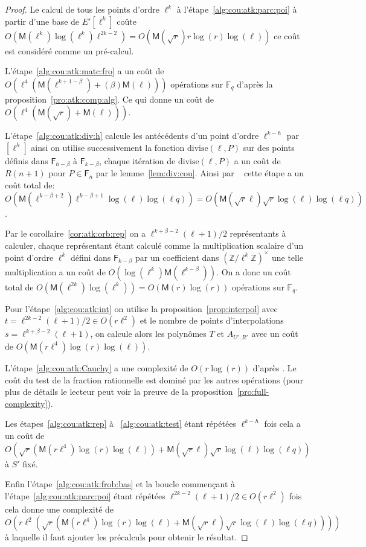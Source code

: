 \documentclass[10pt,a4paper]{book}
\theoremstyle{plain}
\theoremstyle{definition}
\theoremstyle{definition}
\theoremstyle{definition}
\theoremstyle{definition}
\theoremstyle{remark}
\theoremstyle{remark}
\theoremstyle{definition}
\begin{document}
\begin{proof}
Le calcul de tous les points d'ordre $\ell^k$ à 
l'étape~\ref{alg:cou:atk:parc:poi} à partir d'une base de $E'[\ell^k]$ coûte 
$O(\mathsf{M}(\ell^k)\log(\ell^k)\ell^{2k-2})=
O(\mathsf{M}(\sqrt{r})r\log(r)\log(\ell))$ ce coût est considéré comme 
un pré-calcul.

L'étape~\ref{alg:cou:atk:matc:fro} a un coût de 
$O(\ell^4(\mathsf{M}(\ell^{k+1-\beta})+(\beta)\mathsf{M}(\ell)))$ 
opérations sur $\mathbb{F}_q$ d'après la proposition~\ref{pro:atk:comp:alg}.
Ce qui donne un coût de $O(\ell^4(\mathsf{M}(\sqrt{r})+\mathsf{M}(\ell)))$.

L'étape~\ref{alg:cou:atk:div:h} calcule les antécédents d'un point d'ordre
$\ell^{k-h}$ par $[\ell^h]$ ainsi on utilise successivement la fonction 
$\mathrm{divise}(\ell,P)$ sur des points définis dans $\mathsf{F}_{h-\beta}$ à
$\mathsf{F}_{k-\beta}$, chaque itération de $\mathrm{divise}(\ell,P)$ a un coût
de $R(n+1)$ pour $P \in \mathsf{F}_n$ par le lemme~\ref{lem:div:cou}. Ainsi 
par ~\cite[Chapter~14.5]{vzGJG03} cette étape a un coût total de: 
$O(\mathsf{M}(\ell^{k-\beta + 2})\ell^{k-\beta+1}\log(\ell)\log(\ell q))=
O(\mathsf{M}(\sqrt{r}\ell)\sqrt{r}\log(\ell)\log(\ell q))$.

Par le corollaire~\ref{cor:atk:orb:rep} on a $\ell^{k+\beta-2}(\ell+1)/2$ 
représentants à calculer, chaque représentant étant 
calculé comme la multiplication scalaire d'un point d'ordre $\ell^k$ défini 
dans $\mathsf{F}_{k-\beta}$ par un coefficient dans 
$(\mathbb{Z}/\ell^k\mathbb{Z})^{\times}$ une telle multiplication a un coût
de $O(\log(\ell^k)\mathsf{M}(\ell^{k-\beta}))$. On a donc un coût total de 
$O(\mathsf{M}(\ell^{2k})\log(\ell^k))=O(\mathsf{M}(r)\log(r))$ opérations sur 
$\mathbb{F}_q$.

Pour l'étape~\ref{alg:cou:atk:int} on utilise la 
proposition~\ref{prop:interpol} avec $t=\ell^{2k-2}(\ell+1)/2 \in O(r\ell^2)$ 
et le nombre de points d'interpolations $s=\ell^{k+\beta-2}(\ell+1)$, on 
calcule alors les polynômes $T$ et $A_{U',R'}$ avec un coût de 
$O(\mathsf{M}(r\ell^4)\log(r)\log(\ell))$. 

L'étape~\ref{alg:cou:atk:Cauchy} a une complexité de $O(r\log(r))$ d'après
\cite[Théorème 7.5]{algeff17}. Le coût du test de la fraction rationnelle est
dominé par les autres opérations (pour plus de détails le lecteur peut voir 
la preuve de la proposition~\ref{pro:full-complexity}).

Les étapes~\ref{alg:cou:atk:rep} à ~\ref{alg:cou:atk:test} étant répétées 
$\ell^{k-h}$ fois cela a un coût de 
$O(\sqrt{r}(\mathsf{M}(r\ell^4)\log(r)\log(\ell))+\mathsf{M}(\sqrt{r}\ell)\sqrt{r}\log(\ell)\log(\ell q))$ 
à $S'$ fixé.

Enfin l'étape~\ref{alg:cou:atk:frob:bas} et la boucle commençant à 
l'étape~\ref{alg:cou:atk:parc:poi} étant répétées $\ell^{2k-2}(\ell+1)/2 \in 
O(r\ell^2)$ fois cela donne une complexité de $O(r \ell^2 (\sqrt{r}(\mathsf{M}(r\ell^4)\log(r)\log(\ell)+\mathsf{M}(\sqrt{r}\ell)\sqrt{r}\log(\ell)\log(\ell q))))$ à laquelle il faut ajouter les précalculs pour obtenir 
le résultat.
\end{proof}
\end{document}
